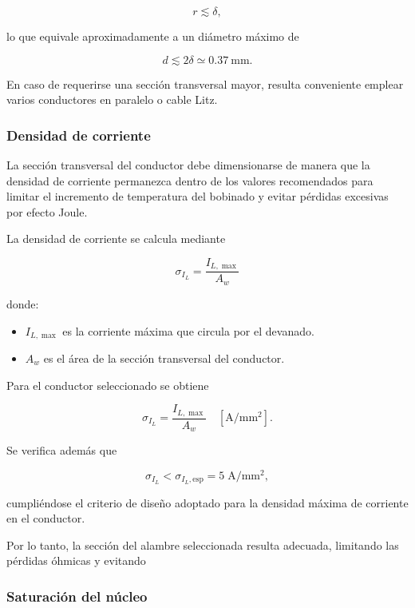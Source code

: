 \documentclass[]{article}
\begin{document}
	\[
	r\lesssim\delta,
	\]
	
	lo que equivale aproximadamente a un diámetro máximo de
	
	\[
	d\lesssim2\delta
	\simeq0.37\ \mathrm{mm}.
	\]
	
	En caso de requerirse una sección transversal mayor, resulta conveniente emplear varios conductores en paralelo o cable Litz.
	
\subsubsection{Densidad de corriente}
	
	La sección transversal del conductor debe dimensionarse de manera que la densidad de corriente permanezca dentro de los valores recomendados para limitar el incremento de temperatura del bobinado y evitar pérdidas excesivas por efecto Joule.
	
	La densidad de corriente se calcula mediante
	
	\begin{equation}
		\sigma_{I_L}=\frac{I_{L,\max}}{A_w}
		\label{eq:densidad_corriente}
	\end{equation}
	
	donde:
	
	\begin{itemize}
		\item $I_{L,\max}$ es la corriente máxima que circula por el devanado.
		\item $A_w$ es el área de la sección transversal del conductor.
	\end{itemize}
	
	Para el conductor seleccionado se obtiene
	
	\[
	\sigma_{I_L}
	=
	\frac{I_{L,\max}}{A_w}
	\quad
	[\mathrm{A/mm^2}].
	\]
	
	Se verifica además que
	
	\begin{equation}
		\sigma_{I_L}
		<
		\sigma_{I_L,\mathrm{esp}}
		=
		5\;\mathrm{A/mm^2},
	\end{equation}
	
	cumpliéndose el criterio de diseño adoptado para la densidad máxima de corriente en el conductor.
	
	Por lo tanto, la sección del alambre seleccionada resulta adecuada, limitando las pérdidas óhmicas y evitando
\subsubsection{Saturación del núcleo} 
	
\end{document}
